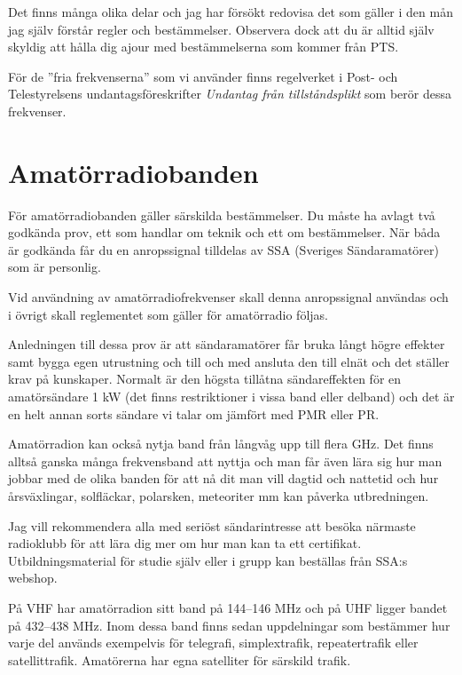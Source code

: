 \documentclass[12ypt,swedish,a4paper]{report}
\begin{document}
Det finns många olika delar och jag har försökt redovisa det som gäller i den mån jag själv förstår regler och bestämmelser. Observera dock att du är alltid själv skyldig att hålla dig ajour med bestämmelserna som kommer från PTS.

För de ''fria frekvenserna'' som vi använder finns regelverket i Post- och Telestyrelsens undantagsföreskrifter \textit{Undantag från tillståndsplikt} som berör dessa frekvenser.

\section{Amatörradiobanden}

För amatörradiobanden gäller särskilda bestämmelser. Du måste ha avlagt två godkända prov, ett som handlar om teknik och ett om bestämmelser. När båda är godkända får du en anropssignal tilldelas av SSA (Sveriges Sändaramatörer) som är personlig.

Vid användning av amatörradiofrekvenser skall denna anropssignal användas och i övrigt skall reglementet som gäller för amatörradio följas. 

Anledningen till dessa prov är att sändaramatörer får bruka långt högre effekter samt bygga egen utrustning och till och med ansluta den till elnät och det ställer krav på kunskaper. Normalt är den högsta tillåtna sändareffekten för en amatörsändare 1 kW (det finns restriktioner i vissa band eller delband) och det är en helt annan sorts sändare vi talar om jämfört med PMR eller PR.

Amatörradion kan också nytja band från långvåg upp till flera GHz. Det finns alltså ganska många frekvensband att nyttja och man får även lära sig hur man jobbar med de olika banden för att nå dit man vill dagtid och nattetid och hur årsväxlingar, solfläckar, polarsken, meteoriter mm kan påverka utbredningen.

Jag vill rekommendera alla med seriöst sändarintresse att besöka närmaste radioklubb för att lära dig mer om hur man kan ta ett certifikat. Utbildningsmaterial för studie själv eller i grupp kan beställas från SSA:s webshop.


På VHF har amatörradion sitt band på 144--146 MHz och på UHF ligger bandet på 432--438 MHz. Inom dessa band finns sedan uppdelningar som bestämmer hur varje del används exempelvis för telegrafi, simplextrafik, repeatertrafik eller satellittrafik. Amatörerna har egna satelliter för särskild trafik.
\end{document}

